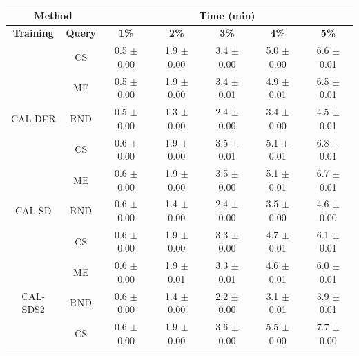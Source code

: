\begin{table}[htbp]
\centering

\begin{tabular*}{\linewidth}{c|c|@{\extracolsep{\fill}}ccccc}
\toprule
\multicolumn{2}{c|}{\textbf{Method}} & \multicolumn{5}{c}{\textbf{Time (min)}} \\
\midrule
\textbf{Training} & \textbf{Query} & \textbf{1\%} & \textbf{2\%} & \textbf{3\%} & \textbf{4\%} & \textbf{5\%}\\
\midrule
 & CS & 0.5 $\pm$ {\small 0.00} & 1.9 $\pm$ {\small 0.00} & 3.4 $\pm$ {\small 0.00} & 5.0 $\pm$ {\small 0.00} & 6.6 $\pm$ {\small 0.01}\\

 & ME & 0.5 $\pm$ {\small 0.00} & 1.9 $\pm$ {\small 0.00} & 3.4 $\pm$ {\small 0.01} & 4.9 $\pm$ {\small 0.01} & 6.5 $\pm$ {\small 0.01}\\

\multirow{-3}{*}{\raggedright\arraybackslash CAL-DER} & RND & 0.5 $\pm$ {\small 0.00} & 1.3 $\pm$ {\small 0.00} & 2.4 $\pm$ {\small 0.00} & 3.4 $\pm$ {\small 0.00} & 4.5 $\pm$ {\small 0.01}\\
\midrule
 & CS & 0.6 $\pm$ {\small 0.00} & 1.9 $\pm$ {\small 0.00} & 3.5 $\pm$ {\small 0.01} & 5.1 $\pm$ {\small 0.01} & 6.8 $\pm$ {\small 0.01}\\

 & ME & 0.6 $\pm$ {\small 0.00} & 1.9 $\pm$ {\small 0.00} & 3.5 $\pm$ {\small 0.00} & 5.1 $\pm$ {\small 0.01} & 6.7 $\pm$ {\small 0.01}\\

\multirow{-3}{*}{\raggedright\arraybackslash CAL-SD} & RND & 0.6 $\pm$ {\small 0.00} & 1.4 $\pm$ {\small 0.00} & 2.4 $\pm$ {\small 0.00} & 3.5 $\pm$ {\small 0.00} & 4.6 $\pm$ {\small 0.00}\\
\midrule
 & CS & 0.6 $\pm$ {\small 0.00} & 1.9 $\pm$ {\small 0.00} & 3.3 $\pm$ {\small 0.00} & 4.7 $\pm$ {\small 0.01} & 6.1 $\pm$ {\small 0.01}\\

 & ME & 0.6 $\pm$ {\small 0.00} & 1.9 $\pm$ {\small 0.01} & 3.3 $\pm$ {\small 0.01} & 4.6 $\pm$ {\small 0.01} & 6.0 $\pm$ {\small 0.01}\\

\multirow{-3}{*}{\raggedright\arraybackslash CAL-SDS2} & RND & 0.6 $\pm$ {\small 0.00} & 1.4 $\pm$ {\small 0.00} & 2.2 $\pm$ {\small 0.00} & 3.1 $\pm$ {\small 0.01} & 3.9 $\pm$ {\small 0.01}\\
\midrule
 & CS & 0.6 $\pm$ {\small 0.00} & 1.9 $\pm$ {\small 0.00} & 3.6 $\pm$ {\small 0.00} & 5.5 $\pm$ {\small 0.00} & 7.7 $\pm$ {\small 0.00}\\


\end{tabular*}
\end{table}
